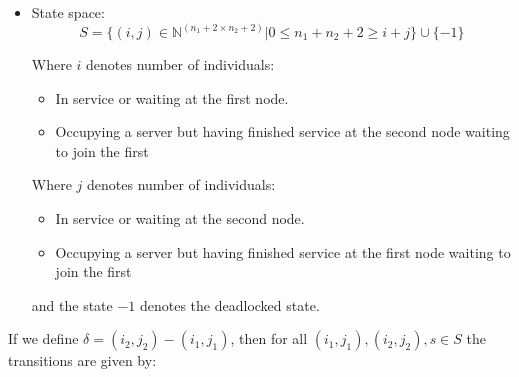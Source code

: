 \documentclass{article}
\begin{document}
\begin{itemize}
    \item State space:
        \[S = \{(i,j)\in\mathbb{N}^{(n_1+2\times n_2+2)}| 0 \leq n_1 + n_2 + 2
        \geq i + j \}\cup\{-1\}\]

        Where \(i\) denotes number of individuals:
            \begin{itemize}
                \item In service or waiting at the first node.
                \item Occupying a server but having finished service at the
                    second node waiting to join the first
            \end{itemize}
        Where \(j\) denotes number of individuals:
            \begin{itemize}
                \item In service or waiting at the second node.
                \item Occupying a server but having finished service at the
                    first node waiting to join the first
            \end{itemize}
        and the state \(-1\) denotes the deadlocked state.
\end{itemize}

If we define $\delta = (i_2, j_2) - (i_1, j_1)$, then for all $(i_1, j_1), (i_2, j_2), s \in S$ the transitions are given by:
\end{document}
